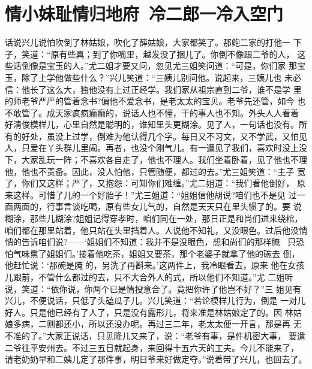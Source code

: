 \chapter{情小妹耻情归地府~冷二郎一冷入空门}

话说兴儿说怕吹倒了林姑娘，吹化了薛姑娘，大家都笑了。那鲍二家的打他一
下子，笑道：“原有些真；到了你嘴里，越发没了捆儿了。你倒不像跟二爷的人，
这些话倒像是宝玉的人。”尤二姐才要又问，忽见尤三姐笑问道：“可是，你们家
那宝玉，除了上学他做些什么？”兴儿笑道：“三姨儿别问他。说起来，三姨儿也
未必信：他长了这么大，独他没有上过正经学。我们家从祖宗直到二爷，谁不是学
里的师老爷严严的管着念书?偏他不爱念书，是老太太的宝贝。老爷先还管，如今
也不敢管了。成天家疯疯癫癫的，说话人也不懂，干的事人也不知。外头人人看着
好清俊模样儿，心里自然是聪明的，谁知里头更糊涂。见了人，一句话也没有。所
有的好处，虽没上过学，倒难为他认得几个字。每日又不习文，又不学武，又怕见
人，只爱在丫头群儿里闹。再者，也没个刚气儿。有一遭见了我们，喜欢时没上没
下，大家乱玩一阵；不喜欢各自走了，他也不理人。我们坐着卧着，见了他也不理
他，他也不责备。因此，没人怕他，只管随便，都过的去。”尤三姐笑道：“主子
宽了，你们又这样；严了，又抱怨：可知你们难缠。”尤二姐道：“我们看他倒好，
原来这样。可惜了儿的一个好胎子！”尤三姐道：“姐姐信他胡说?咱们也不是见
过一面两面的，行事言谈吃喝，原有些女儿气的，自然是天天只在里头惯了的。要
说糊涂，那些儿糊涂?姐姐记得穿孝时，咱们同在一处，那日正是和尚们进来绕棺，
咱们都在那里站着，他只站在头里挡着人。人说他不知礼，又没眼色。过后他没悄
悄的告诉咱们说?——‘姐姐们不知道：我并不是没眼色，想和尚们的那样腌，
只恐怕气味熏了姐姐们。’接着他吃茶，姐姐又要茶，那个老婆子就拿了他的碗去
倒，他赶忙说：‘那碗是腌的，另洗了再斟来。’这两件上，我冷眼看去，原来
他在女孩儿跟前，不管什么都过的去，只不大合外人的式，所以他们不知道。”尤
二姐听说，笑道：“依你说，你两个已是情投意合了。竟把你许了他岂不好？”三
姐见有兴儿，不便说话，只低了头磕瓜子儿。兴儿笑道：“若论模样儿行为，倒是
一对儿好人。只是他已经有了人了，只是没有露形儿，将来准是林姑娘定了的。因
林姑娘多病，二则都还小，所以还没办呢。再过三二年，老太太便一开言，那是再
无不准的了。”大家正说话，只见隆儿又来了，说：“老爷有事，是件机密大事，
要遣二爷往平安州去。不过三五日就起身，来回得十五六天的工夫。今儿不能来了，
请老奶奶早和二姨儿定了那件事，明日爷来好做定夺。”说着带了兴儿，也回去了。

